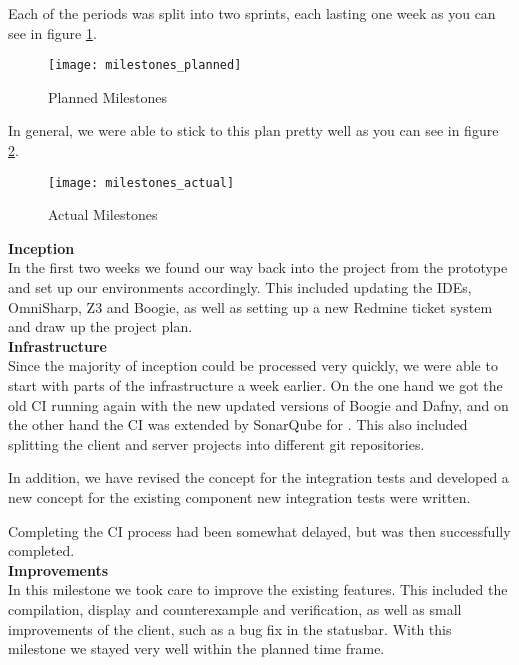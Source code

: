 Each of the periods was split into two sprints, each lasting one week
as you can see in figure \ref{fig:planned_milestones}.

\begin{figure}[H]
    \centering
    \texttt{[image: milestones\_planned]}
    \caption{Planned Milestones}
    \label{fig:planned_milestones}
\end{figure}

In general, we were able to stick to this plan pretty well as you can see in figure \ref{fig:actual_milestones}.

\begin{figure}[H]
    \centering
    \texttt{[image: milestones\_actual]}
    \caption{Actual Milestones}
    \label{fig:actual_milestones}
\end{figure}

{\bf Inception}\\
In the first two weeks we found our way back into the project from the prototype
and set up our environments accordingly.
This included updating the IDEs, OmniSharp, Z3 and Boogie,
as well as setting up a new Redmine ticket system and draw up the project plan.\\

{\bf Infrastructure}\\
Since the majority of inception could be processed very quickly,
we were able to start with parts of the infrastructure a week earlier.
On the one hand we got the old CI running again with the new updated versions of Boogie and Dafny,
and on the other hand the CI was extended by SonarQube for \Csharp.
This also included splitting the client and server projects into different git repositories.

In addition, we have revised the concept for the integration tests and developed
a new concept for the existing component
new integration tests were written.

Completing the CI process had been somewhat delayed, but was then successfully completed.\\

{\bf Improvements}\\
In this milestone we took care to improve the existing features.
This included the compilation, display and counterexample and verification,
as well as small improvements of the client, such as a bug fix in the statusbar.
With this milestone we stayed very well within the planned time frame.\\

